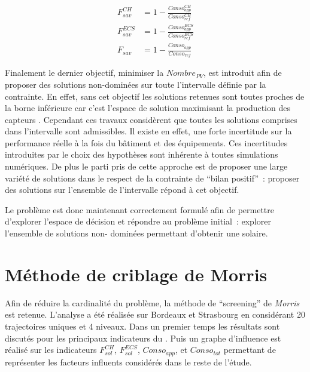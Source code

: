 \begin{align}\label{eq:taux_economie_opti}
  F_{sav}^{CH}   &= 1 - \frac{Conso_{app}^{CH}}{Conso_{ref}^{CH}} \\
  F_{sav}^{ECS}  &= 1 - \frac{Conso_{app}^{ECS}}{Conso_{ref}^{ECS}} \\
  F_{sav}        &= 1 - \frac{Conso_{app}}{Conso_{ref}}
\end{align}

Finalement le dernier objectif, minimiser la $Nombre_{PV}$, est introduit afin de proposer
des solutions non-dominées sur toute l’intervalle définie par la contrainte. En effet,
sans cet objectif les solutions retenues sont toutes proches de la borne inférieure car
c’est l’espace de solution maximisant la production des capteurs . Cependant ces
travaux considèrent que toutes les solutions comprises dans l’intervalle sont admissibles.
Il existe en effet, une forte incertitude sur la performance réelle à la fois du bâtiment
et des équipements. Ces incertitudes introduites par le choix des hypothèses sont
inhérente à toutes simulations numériques. De plus le parti pris de cette approche est de
proposer une large variété de solutions dans le respect de la contrainte de \enquote{bilan
positif}~: proposer des solutions sur l’ensemble de l’intervalle répond à cet objectif.

Le problème est donc maintenant correctement formulé afin de permettre d’explorer l’espace
de décision et répondre au problème initial~: explorer l’ensemble de solutions non-
dominées permettant d’obtenir une  solaire.



\section{Méthode de criblage de Morris} %
\label{sec:methode_criblage_de_morris}
Afin de réduire la cardinalité du problème, la méthode de \enquote{screening} de
\textit{Morris} est retenue. L’analyse a été réalisée sur Bordeaux et Strasbourg en
considérant \num{20} trajectoires uniques et \num{4} niveaux. Dans un premier temps les
résultats sont discutés pour les principaux indicateurs du . Puis un graphe
d’influence est réalisé sur les indicateurs $F_{sol}^{CH}$, $F_{sol}^{ECS}$,
$Conso_{app}$, et $Conso_{tot}$ permettant de représenter les facteurs influents
considérés dans le reste de l’étude.

